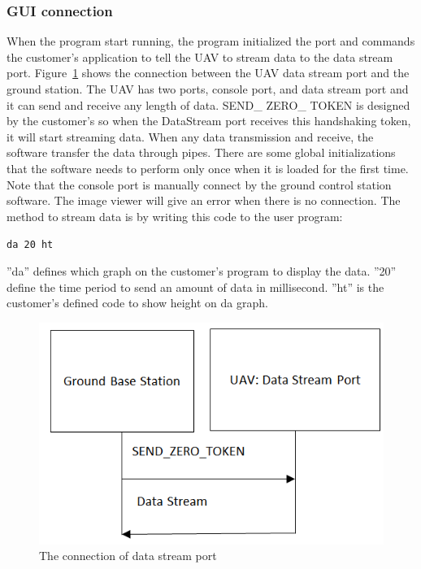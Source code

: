 \documentclass[oneside]{ecsgdp}         %
\begin{document}
\subsubsection*{GUI connection}
 When the program start running, the program initialized the port and commands the customer’s application to tell the UAV to stream data to the data stream port. Figure~\ref{GCS_connect_command} shows the connection between the UAV data stream port and the ground station. The UAV has two ports, console port, and data stream port and it can send and receive any length of data. SEND\_ ZERO\_ TOKEN is designed by the customer’s so when the DataStream port receives this handshaking token, it will start streaming data. When any data transmission and receive, the software transfer the data through pipes. There are some global initializations that the software needs to perform only once when it is loaded for the first time. Note that the console port is manually connect by the ground control station software. The image viewer will give an error when there is no connection.
 The method to stream data is by writing this code to the user program:
 
\begin{center}
\texttt{da 20 ht}
\end{center}

''da'' defines which graph on the customer's program to display the data. ''20'' define the time period to send an amount of data in millisecond. ''ht'' is the customer's defined code to show height on da graph. 


\begin{center}
\begin{figure}[!hbtp]
\includegraphics[scale=0.5]{connect_command.png} 
\caption{The connection of data stream port\label{GCS_connect_command}}
\end{figure}
\end{center}
\end{document}
